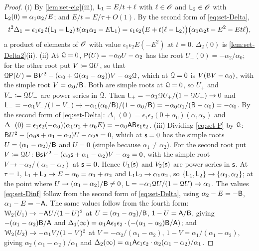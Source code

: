 \begin{proof}
(i) By \cref{lem:set-eig}(iii), $\mathsf{L}_1=E/t+\ell$ with $\ell\in\mathscr{O}$ and $\mathsf{L}_2\in\mathscr{O}$ with $\mathsf{L}_2(0)=\alpha_1\alpha_2/E$; and $E/t=E/\tau+O(1)$. By the second form of \eqref{eq:set-Delta},
\[
t^2\Delta_1=\epsilon_1\epsilon_2\,t(\mathsf{L}_1-\mathsf{L}_2)\,t(\alpha_1\alpha_2-E\mathsf{L}_1)=\epsilon_1\epsilon_2\big(E+t(\ell-\mathsf{L}_2)\big)\big(\alpha_1\alpha_2t-E^2-Et\ell\big),
\]
a product of elements of $\mathscr{O}$ with value $\epsilon_1\epsilon_2E(-E^2)$ at $t=0$. $\Delta_2(0)$ is \cref{lem:set-Delta2}(ii).
(ii) At $\mathcal{Q}=0$, $\mathsf{P}(U)=-\alpha_0U-\alpha_2$ has the root $U_+(0)=-\alpha_2/\alpha_0$; for the other root put $V\coloneqq\mathcal{Q} U$, so that $\mathcal{Q}\mathsf{P}(U)=\mathsf{B} V^2-(\alpha_0+\mathcal{Q}(\alpha_1-\alpha_2))V-\alpha_2\mathcal{Q}$, which at $\mathcal{Q}=0$ is $V(\mathsf{B} V-\alpha_0)$, with the simple root $V=\alpha_0/\mathsf{B}$. Both are simple roots at $\mathcal{Q}=0$, so $U_+$ and $V_-\coloneqq\mathcal{Q} U_-$ are power series in $\mathcal{Q}$. Then $\mathsf{L}_+=-\alpha_1\mathcal{Q} U_+/(1-\mathcal{Q} U_+)\to0$ and $\mathsf{L}_-=-\alpha_1V_-/(1-V_-)\to-\alpha_1(\alpha_0/\mathsf{B})/(1-\alpha_0/\mathsf{B})=-\alpha_0\alpha_1/(\mathsf{B}-\alpha_0)=-\alpha_0$. By the second form of \eqref{eq:set-Delta}: $\Delta_+(0)=\epsilon_1\epsilon_2(0+\alpha_0)(\alpha_1\alpha_2)$ and $\Delta_-(0)=\epsilon_1\epsilon_2(-\alpha_0)(\alpha_1\alpha_2+\alpha_0E)=-\alpha_0\mathsf{A}\mathsf{B}\epsilon_1\epsilon_2$.
(iii) Dividing \eqref{eq:set-P} by $\mathcal{Q}$: $\mathsf{B} U^2-(\alpha_0\mathsf{s}+\alpha_1-\alpha_2)U-\alpha_2\mathsf{s}=0$, which at $\mathsf{s}=0$ has the simple roots $U=(\alpha_1-\alpha_2)/\mathsf{B}$ and $U=0$ (simple because $\alpha_1\neq\alpha_2$). For the second root put $V\coloneqq\mathcal{Q} U$: $\mathsf{B}\mathsf{s} V^2-(\alpha_0\mathsf{s}+\alpha_1-\alpha_2)V-\alpha_2=0$, with the simple root $V\to-\alpha_2/(\alpha_1-\alpha_2)$ at $\mathsf{s}=0$. Hence $U_1(\mathsf{s})$ and $V_2(\mathsf{s})$ are power series in $\mathsf{s}$. At $\tau=1$, $\mathsf{L}_1+\mathsf{L}_2\to E-\alpha_0=\alpha_1+\alpha_2$ and $\mathsf{L}_1\mathsf{L}_2\to\alpha_1\alpha_2$, so $\{\mathsf{L}_1,\mathsf{L}_2\}\to\{\alpha_1,\alpha_2\}$; at the point where $U\to(\alpha_1-\alpha_2)/\mathsf{B}\neq0$, $\mathsf{L}=-\alpha_1\mathcal{Q} U/(1-\mathcal{Q} U)\to\alpha_1$. The values \eqref{eq:set-Dinf} follow from the second form of \eqref{eq:set-Delta}, using $\alpha_2-E=-\mathsf{B}$, $\alpha_1-E=-\mathsf{A}$. The same values follow from the fourth form: $\mathcal{W}_2(U_1)\to-\mathsf{A} U/(1-U)^2$ at $U=(\alpha_1-\alpha_2)/\mathsf{B}$, $1-U=\mathsf{A}/\mathsf{B}$, giving $-(\alpha_1-\alpha_2)\mathsf{B}/\mathsf{A}$ and $\Delta_1(\infty)=\alpha_1\mathsf{A}\epsilon_1\epsilon_2\cdot(-(\alpha_1-\alpha_2)\mathsf{B}/\mathsf{A})$; and $\mathcal{W}_2(U_2)\to-\alpha_1V/(1-V)^2$ at $V=-\alpha_2/(\alpha_1-\alpha_2)$, $1-V=\alpha_1/(\alpha_1-\alpha_2)$, giving $\alpha_2(\alpha_1-\alpha_2)/\alpha_1$ and $\Delta_2(\infty)=\alpha_1\mathsf{A}\epsilon_1\epsilon_2\cdot\alpha_2(\alpha_1-\alpha_2)/\alpha_1$.
\end{proof}


